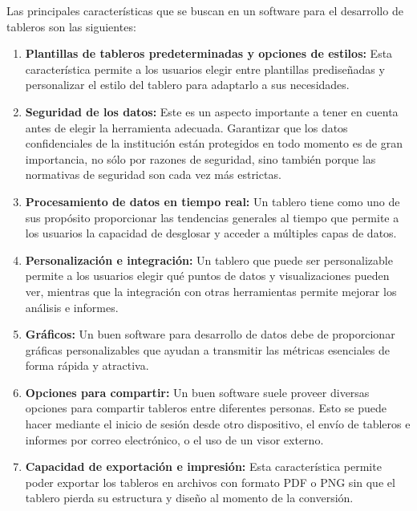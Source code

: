 Las principales características que se buscan en un software para el desarrollo de tableros son las siguientes:

\begin{enumerate}
    \item \textbf{Plantillas de tableros predeterminadas y opciones de estilos:} Esta característica permite a los usuarios elegir entre plantillas prediseñadas y personalizar el estilo del tablero para adaptarlo a sus necesidades.
    
    \item \textbf{Seguridad de los datos:} Este es un aspecto importante a tener en cuenta antes de elegir la herramienta adecuada. Garantizar que los datos confidenciales de la institución están protegidos en todo momento es de gran importancia, no sólo por razones de seguridad, sino también porque las normativas de seguridad son cada vez más estrictas.
    
    \item \textbf{Procesamiento de datos en tiempo real:} Un tablero tiene como uno de sus propósito proporcionar las tendencias generales al tiempo que permite a los usuarios la capacidad de desglosar y acceder a múltiples capas de datos.
    
    \item \textbf{Personalización e integración:} Un tablero que puede ser personalizable permite a los usuarios elegir qué puntos de datos y visualizaciones pueden ver, mientras que la integración con otras herramientas permite mejorar los análisis e informes.

    
    \item \textbf{Gráficos:} Un buen software para desarrollo de datos debe de proporcionar gráficas personalizables que ayudan a transmitir las métricas esenciales de forma rápida y atractiva.

    \item \textbf{Opciones para compartir:} Un buen software suele proveer diversas opciones para compartir tableros entre diferentes personas. Esto se puede hacer mediante el inicio de sesión desde otro dispositivo, el envío de tableros e informes por correo electrónico, o el uso de un visor externo.

    \item \textbf{Capacidad de exportación e impresión:} Esta característica permite poder exportar los tableros en archivos con formato PDF o PNG sin que el tablero pierda su estructura y diseño al momento de la conversión.
    
    
\end{enumerate}





